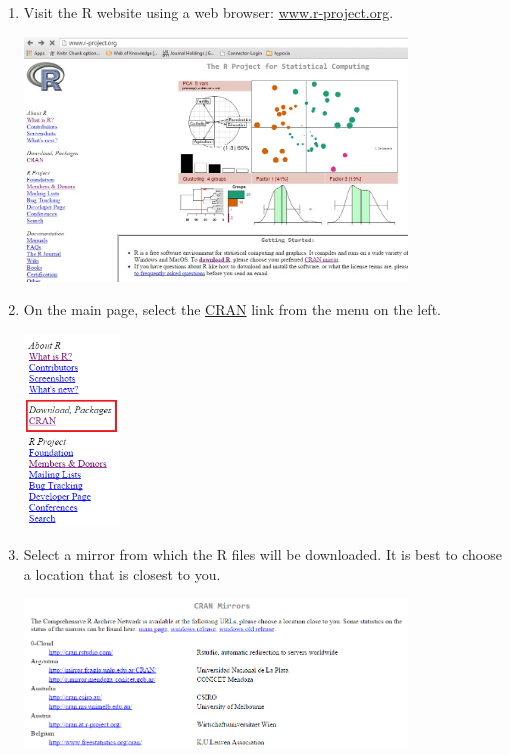 \documentclass[letterpaper,12pt]{article}\usepackage[]{graphicx}\usepackage[]{color}
\begin{document}
\begin{enumerate}

\item{Visit the R website using a web browser: \href{http://www.r-project.org}{www.r-project.org}.}

\includegraphics[width=0.8\textwidth]{figs/rpage.jpg}

\item{On the main page, select the \href{http://cran.r-project.org/mirrors.html}{CRAN} link from the menu on the left.}

\includegraphics[width=0.2\textwidth]{figs/cransel.png}

\item{Select a mirror from which the R files will be downloaded.  It is best to choose a location that is closest to you.}

\includegraphics[width=0.8\textwidth]{figs/mirrors.png}


\end{enumerate}
\end{document}
